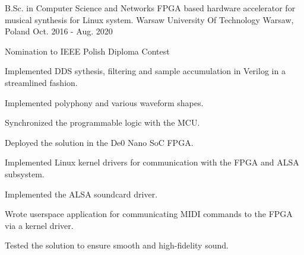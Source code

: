 \begin{cventries}
  \cventry
    {B.Sc. in Computer Science and Networks \newline FPGA based hardware accelerator for musical synthesis for Linux system.} %
    {Warsaw University Of Technology} %
    {Warsaw, Poland} %
    {Oct. 2016 - Aug. 2020} %
    {
      \begin{cvitems} %
          \item { Nomination to IEEE Polish Diploma Contest }
          \item { Implemented DDS sythesis, filtering and sample accumulation in Verilog in a streamlined fashion. }
          \item { Implemented polyphony and various waveform shapes.}
          \item { Synchronized the programmable logic with the MCU. }
          \item { Deployed the solution in the De0 Nano SoC FPGA.}
          \item { Implemented Linux kernel drivers for communication with the FPGA and ALSA subsystem. }
          \item { Implemented the ALSA soundcard driver.}
          \item { Wrote userspace application for communicating MIDI commands to the FPGA via a kernel driver. }
          \item { Tested the solution to ensure smooth and high-fidelity sound.}
      \end{cvitems}
    }

\end{cventries}
